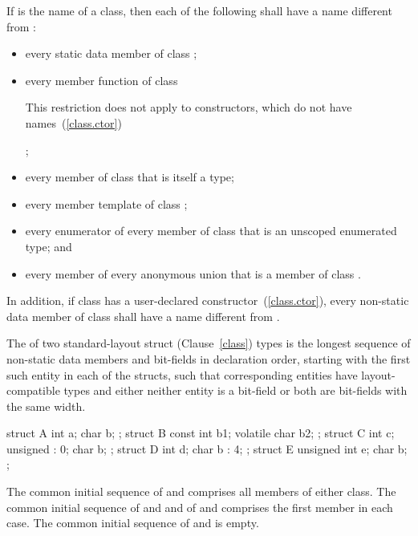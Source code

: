 \pnum
If  is the name of a class, then each of the following shall
have a name different from :

\begin{itemize}
\item every static data member of class ;

\item every member function of class 
\begin{note}
This restriction does not apply to constructors, which do not have
names~(\ref{class.ctor})
\end{note};

\item every member of class  that is itself a type;

\item every member template of class ;

\item every enumerator of every member of class  that is an
unscoped enumerated type; and

\item every member of every anonymous union that is a member of class
.
\end{itemize}

\pnum
In addition, if class  has a user-declared
constructor~(\ref{class.ctor}), every non-static data member of class
 shall have a name different from .

\pnum
The  of two standard-layout struct (Clause~\ref{class})
types is the longest sequence of non-static data
members and bit-fields in declaration order, starting with the first
such entity in each of the structs, such that corresponding entities
have layout-compatible types and either neither entity is a bit-field or
both are bit-fields with the same width.
\begin{example}
\begin{codeblock}
  struct A { int a; char b; };
  struct B { const int b1; volatile char b2; };
  struct C { int c; unsigned : 0; char b; };
  struct D { int d; char b : 4; };
  struct E { unsigned int e; char b; };
\end{codeblock}
The common initial sequence of  and  comprises all members
of either class. The common initial sequence of  and  and
of  and  comprises the first member in each case.
The common initial sequence of  and  is empty.
\end{example}

